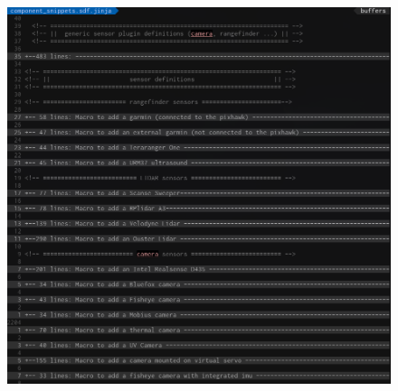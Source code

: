 \documentclass[aspectratio=169,9pt]{beamer}
\begin{document}
\begin{frame}
\begin{columns}[c]
{      \begin{figure}
        \includegraphics[width=1.0\textwidth]{./fig/component_snippets.png}
      \end{figure}
    }



\end{columns}
\end{frame}
\end{document}
